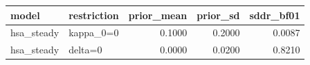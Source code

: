 \begin{tabular}{llrrr}
\toprule
model & restriction & prior\_mean & prior\_sd & sddr\_bf01 \\
\midrule
hsa\_steady & kappa\_0=0 & 0.1000 & 0.2000 & 0.0087 \\
hsa\_steady & delta=0 & 0.0000 & 0.0200 & 0.8210 \\
\bottomrule
\end{tabular}
